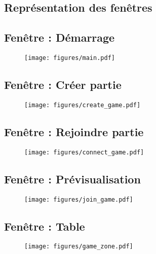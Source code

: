 \begin{appendices}

\chapter{Représentation des fenêtres}

\section{Fenêtre : Démarrage}

\begin{figure}[ht]
	\centering \texttt{[image: figures/main.pdf]}
\end{figure}
\clearpage

\section{Fenêtre : Créer partie}
\begin{figure}[ht]
	\centering \texttt{[image: figures/create\_game.pdf]}
\end{figure}
\clearpage

\section{Fenêtre : Rejoindre partie}

\begin{figure}[ht]
	\centering \texttt{[image: figures/connect\_game.pdf]}
\end{figure}
\clearpage

\section{Fenêtre : Prévisualisation}

\begin{figure}[ht]
	\centering \texttt{[image: figures/join\_game.pdf]}
\end{figure}
\clearpage

\section{Fenêtre : Table}

\begin{figure}[ht]
	\centering \texttt{[image: figures/game\_zone.pdf]}
\end{figure}
\clearpage


\end{appendices}
